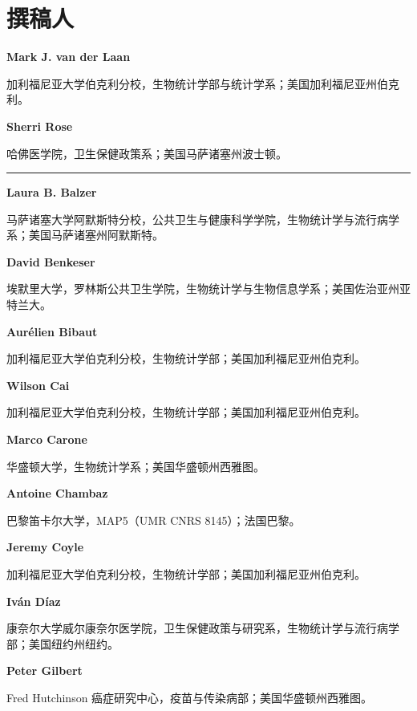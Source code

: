 \chapter*{撰稿人}
\noindent\textbf{Mark J. van der Laan}\par
加利福尼亚大学伯克利分校，生物统计学部与统计学系；美国加利福尼亚州伯克利。

\noindent\textbf{Sherri Rose}\par
哈佛医学院，卫生保健政策系；美国马萨诸塞州波士顿。

\medskip\noindent\rule{.25\textwidth}{.3pt}\par\medskip
{}
\noindent\textbf{Laura B. Balzer}\par
马萨诸塞大学阿默斯特分校，公共卫生与健康科学学院，生物统计学与流行病学系；美国马萨诸塞州阿默斯特。

\noindent\textbf{David Benkeser}\par
埃默里大学，罗林斯公共卫生学院，生物统计学与生物信息学系；美国佐治亚州亚特兰大。

\noindent\textbf{Aurélien Bibaut}\par
加利福尼亚大学伯克利分校，生物统计学部；美国加利福尼亚州伯克利。

\noindent\textbf{Wilson Cai}\par
加利福尼亚大学伯克利分校，生物统计学部；美国加利福尼亚州伯克利。

\noindent\textbf{Marco Carone}\par
华盛顿大学，生物统计学系；美国华盛顿州西雅图。

\noindent\textbf{Antoine Chambaz}\par
巴黎笛卡尔大学，MAP5（UMR CNRS 8145）；法国巴黎。

\noindent\textbf{Jeremy Coyle}\par
加利福尼亚大学伯克利分校，生物统计学部；美国加利福尼亚州伯克利。

\noindent\textbf{Iván Díaz}\par
康奈尔大学威尔康奈尔医学院，卫生保健政策与研究系，生物统计学与流行病学部；美国纽约州纽约。

\noindent\textbf{Peter Gilbert}\par
Fred Hutchinson 癌症研究中心，疫苗与传染病部；美国华盛顿州西雅图。

